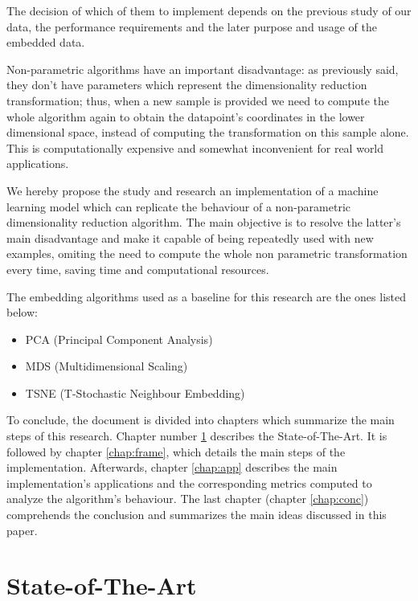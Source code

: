 \documentclass[a4paper,11pt,spanish]{report}
\begin{document}
The decision of which of them to implement depends on the previous study of our data, the performance requirements and the later purpose and usage of the embedded data.

Non-parametric algorithms have an important disadvantage: as previously said, they don't have parameters which represent the dimensionality reduction transformation; thus, when a new sample is provided we need to compute the whole algorithm again to obtain the datapoint's coordinates in the lower dimensional space, instead of computing the transformation on this sample alone. This is computationally expensive and somewhat inconvenient for real world applications.

We hereby propose the study and research an implementation of a machine learning model which can replicate the behaviour of a non-parametric dimensionality reduction algorithm. The main objective is to resolve the latter's main disadvantage and make it capable of being repeatedly used with new examples, omiting the need to compute the whole non parametric transformation every time, saving time and computational resources.

The embedding algorithms used as a baseline for this research are the ones listed below:

\renewcommand{\labelitemi}{\textendash}
\begin{itemize}
\item PCA (Principal Component Analysis)
\item MDS (Multidimensional Scaling)
\item TSNE (T-Stochastic Neighbour Embedding)
\end{itemize}

To conclude, the document is divided into chapters which summarize the main steps of this research. Chapter number \ref{chap:stt} describes the State-of-The-Art. It is followed by chapter \ref{chap:frame}, which details the main steps of the implementation. Afterwards, chapter \ref{chap:app} describes the main implementation's applications and the corresponding metrics computed to analyze the algorithm's behaviour. The last chapter (chapter \ref{chap:conc}) comprehends the conclusion and summarizes the main ideas discussed in this paper.


\chapter{State-of-The-Art}
\label{chap:stt}
\end{document}
